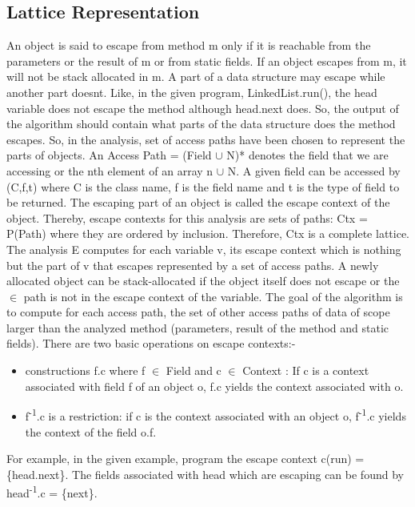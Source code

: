\documentclass[peerreview]{IEEEtran}
\begin{document}
\subsection{Lattice Representation}
An object is said to escape from method m only if it is reachable from the parameters or the result of m or from static fields. If an object escapes from m, it will not be stack allocated in m. A part of a data structure may escape while another part doesnt. Like, in the given program, LinkedList.run(), the head variable does not escape the method although head.next does. So, the output of the algorithm should contain what parts of the data structure does the method escapes. So, in the analysis, set of access paths have been chosen to represent the parts of objects. An Access Path = (Field $\cup$ N)* denotes the field that we are accessing or the nth element of an array n $\cup$ N. A given field can be accessed by (C,f,t) where C is the class name, f is the field name and t is the type of field to be returned. The escaping part of an object is called the escape context of the object. Thereby, escape contexts for this analysis are sets of paths: Ctx = P(Path) where they are ordered by inclusion. Therefore, Ctx is a complete lattice. The analysis E computes for each variable v, its escape context which is nothing but the part of v that escapes represented by a set of access paths. A newly allocated object can be stack-allocated if the object itself does not escape or the $\in$ path is not in the escape context of the variable. The goal of the algorithm is to compute for each access path, the set of other access paths of data of scope larger than the analyzed method (parameters, result of the method and static fields). There are two basic operations on escape contexts:-
\begin{itemize}
\item constructions f.c where f $\in$ Field and c $\in$ Context : If c is a context associated with field f of an object o, f.c yields the context associated with o. 
\item f\textsuperscript{-1}.c is a restriction: if c is the context associated with an object o, f\textsuperscript{-1}.c yields the context of the field o.f. 
\end{itemize}
For example, in the given example, program the escape context c(run) = \{head.next\}. The fields associated with head which are escaping can be found by head\textsuperscript{-1}.c =  \{next\}.
\end{document}
